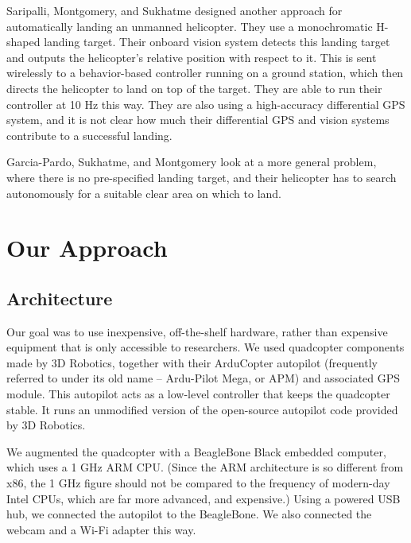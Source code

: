\documentclass[10pt]{scrartcl} %
\begin{document}
Saripalli, Montgomery, and Sukhatme \cite{saripalli_et_al_2002} designed
another approach for automatically landing an unmanned helicopter. They use a
monochromatic H-shaped landing target. Their onboard vision system detects this
landing target and outputs the helicopter's relative position with respect to
it. This is sent wirelessly to a behavior-based controller running on a ground
station, which then directs the helicopter to land on top of the target. They
are able to run their controller at 10 Hz this way. They are also using a
high-accuracy differential GPS system, and it is not clear how much their
differential GPS and vision systems contribute to a successful landing.

Garcia-Pardo, Sukhatme, and Montgomery \cite{garcia_pardo_et_al_2002} look at a
more general problem, where there is no pre-specified landing target, and their
helicopter has to search autonomously for a suitable clear area on which to
land.


\section{Our Approach}

\subsection{Architecture}

Our goal was to use inexpensive, off-the-shelf hardware, rather than expensive
equipment that is only accessible to researchers. We used quadcopter components
made by 3D Robotics, together with their ArduCopter autopilot (frequently
referred to under its old name -- Ardu-Pilot Mega, or APM) and associated GPS
module. This autopilot acts as a low-level controller that keeps the quadcopter
stable. It runs an unmodified version of the open-source autopilot code
provided by 3D Robotics.

We augmented the quadcopter with a BeagleBone Black embedded computer, which
uses a 1 GHz ARM CPU. (Since the ARM architecture is so different from x86,
the 1 GHz figure should not be compared to the frequency of modern-day Intel
CPUs, which are far more advanced, and expensive.) Using a powered USB hub, we
connected the autopilot to the BeagleBone. We also connected the webcam and a
Wi-Fi adapter this way.
\end{document}
